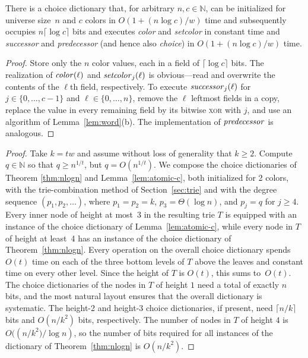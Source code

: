 \documentclass[envcountsame,envcountsect,undated,nolinenumbers]{lnthi}
\def\Fpasteinsection#1{#1
}
\def\Tvn#1{\hbox{\textit{#1\/}}}
\def\Tceil#1{\lceil #1\rceil}
\def\TbbbN{\mathbb{N}}
\begin{document}
\begin{lemma}
\label{lem:atomic-c}There is a choice dictionary that, for arbitrary
$n,c\in\TbbbN$, can be initialized for universe size~$n$
and $c$ colors in $O(1+{{(n\log c)}/w})$ time
and subsequently occupies $n\Tceil{\log c}$
bits and executes \Tvn{color} and \Tvn{setcolor}
in constant time and \Tvn{successor} and
\Tvn{predecessor} (and hence also \Tvn{choice})
in $O(1+{{(n\log c)}/w})$ time.
\end{lemma}

\begin{proof}
Store only the $n$ color values, each in a
field of $\Tceil{\log c}$ bits.
The realization of $\Tvn{color}(\ell)$ and
$\Tvn{setcolor}_j(\ell)$ is obvious---read and overwrite
the contents of the $\ell$th field,
respectively.
To execute $\Tvn{successor}_j(\ell)$ for
$j\in\{0,\ldots,c-1\}$ and $\ell\in\{0,\ldots,n\}$,
remove the $\ell$ leftmost fields in a copy, replace
the value in
every remaining field by its bitwise
\textsc{xor} with $j$, and use an algorithm
of Lemma~\ref{lem:word}(b).
The implementation of $\Tvn{predecessor}$ is
analogous.
\end{proof}

\Fpasteinsection{}

\begin{proof}
Take $k=t w$ and assume without loss of generality that $k\ge 2$.
Compute $q\in\TbbbN$ so that
$q\ge n^{1/t}$, but $q=O(n^{1/t})$.
We compose the choice dictionaries of
Theorem \ref{thm:nlogn}
and Lemma~\ref{lem:atomic-c}, both
initialized for 2 colors,
with the trie-combination method of
Section~\ref{sec:trie} and with the degree
sequence $(p_1,p_2,\ldots)$,
where $p_1=p_2=k$,
$p_3=\Theta(\log n)$, and
$p_j=q$ for $j\ge 4$.
Every inner node of height at most~3 in the resulting trie $T$
is equipped with an instance of the choice dictionary
of Lemma~\ref{lem:atomic-c},
while every node in $T$
of height at least~4
has an instance of
the choice dictionary of Theorem~\ref{thm:nlogn}.
Every operation
on the overall choice dictionary spends $O(t)$
time on each of the three bottom levels of $T$ above the leaves
and constant time on every other level.
Since the height of $T$ is $O(t)$, this
sums to~$O(t)$.
The choice dictionaries of the nodes in $T$
of height $1$ need a total of exactly $n$ bits,
and the most natural layout ensures that the
overall dictionary is systematic.
The height-2 and height-3 choice dictionaries,
if present, need
$\Tceil{n/k}$ bits and $O({n/{k^2}})$ bits,
respectively.
The number of nodes in $T$ of height $4$
is $O(({{{n/{k^2}})}/{\log n}})$, so
the number of bits required for all instances
of the dictionary of Theorem~\ref{thm:nlogn}
is $O({n/{k^2}})$.
\end{proof}
\end{document}
